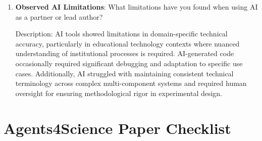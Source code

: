 \documentclass{article}
\begin{document}
\begin{enumerate}
    Answer: \involvementB{}

    Explanation: The paper structure, technical content, and narrative were primarily written by human researchers. AI tools assisted with grammar checking, sentence refinement, literature review compilation, and formatting consistency. The core technical contributions, methodology descriptions, and result interpretations were authored by humans with AI providing editorial assistance.

    \item \textbf{Observed AI Limitations}: What limitations have you found when using AI as a partner or lead author?

    Description: AI tools showed limitations in domain-specific technical accuracy, particularly in educational technology contexts where nuanced understanding of institutional processes is required. AI-generated code occasionally required significant debugging and adaptation to specific use cases. Additionally, AI struggled with maintaining consistent technical terminology across complex multi-component systems and required human oversight for ensuring methodological rigor in experimental design.
\end{enumerate}

\newpage

\section*{Agents4Science Paper Checklist}
\end{document}
